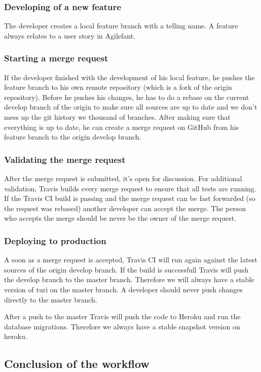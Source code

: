 \documentclass[a4paper]{article}
\begin{document}
\subsubsection{Developing of a new feature}
The developer creates a local feature branch with a telling name. A feature always relates to a user story in Agilefant.


\subsubsection{Starting a merge request}
If the developer finished with the development of his local feature, he pushes the feature branch to his own remote repository (which is a fork of the origin repository). Before he pushes his changes, he has to do a rebase on the current develop branch of the origin to make sure all sources are up to date and we don't mess up the git history we thousand of branches. After making sure that everything is up to date, he can create a merge request on GitHub from his feature branch to the origin develop branch.

\subsubsection{Validating the merge request}
After the merge request is submitted, it's open for discussion. For additional validation, Travis builds every merge request to ensure that all tests are running. If the Travis CI build is passing and the merge request can be fast forwarded (so the request was rebased) another developer can accept the merge. The person who accepts the merge should be never be the owner of the merge request.

\subsubsection{Deploying to production}
A soon as a merge request is accepted, Travis CI will run again against the latest sources of the origin develop branch. If the build is successfull Travis will push the develop branch to the master branch. Therefore we will always have a stable version of turi on the master branch. A developer should never push changes directly to the master branch.

After a push to the master Travis will push the code to Heroku and run the database migrations. Therefore we always have a stable snapshot version on heroku.

\subsection{Conclusion of the workflow}
\end{document}
